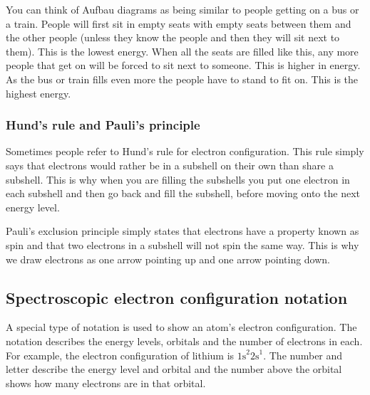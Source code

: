         

\label{m38741*eip-873}You can think of Aufbau diagrams as being similar to people getting on a bus or a train. People will first sit in empty seats with empty seats between them and the other people (unless they know the people and then they will sit next to them). This is the lowest energy. When all the seats are filled like this, any more people that get on will be forced to sit next to someone. This is higher in energy. As the bus or train fills even more the people have to stand to fit on. This is the highest energy.  \label{m38741*id259728}
            \subsubsection*{Hund's rule and Pauli's principle}
            \nopagebreak
            \label{m38741*eip-188}
Sometimes people refer to Hund's rule for electron configuration. This rule simply says that electrons would rather be in a subshell on their own than share a subshell. This is why when you are filling the subshells you put one electron in each subshell and then go back and fill the subshell, before moving onto the next energy level.
\par 
\label{m38741*eip-id1167385514309}
Pauli's exclusion principle simply states that electrons have a property known as spin and that two electrons in a subshell will not spin the same way. This is why we draw electrons as one arrow pointing up and one arrow pointing down.
\par \label{m38741*uid104}
\subsection*{Spectroscopic electron configuration notation}
        \label{m38741*id259749}A special type of notation is used to show an atom's electron configuration. The notation describes the energy levels, orbitals and the number of electrons in each. For example, the electron configuration of lithium is ${1\text{s}}^{2}{2\text{s}}^{1}$. The number and letter describe the energy level and orbital and the number above the orbital shows how many electrons are in that orbital. 

